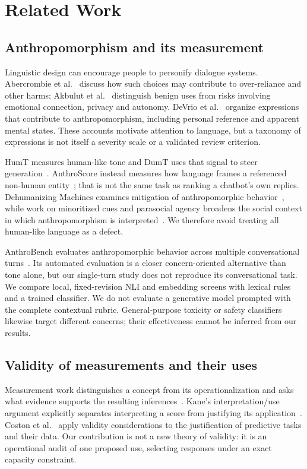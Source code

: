 \section{Related Work}
\subsection{Anthropomorphism and its measurement}
Linguistic design can encourage people to personify dialogue systems. Abercrombie et al.~\cite{abercrombie2023anthropomorphism} discuss how such choices may contribute to over-reliance and other harms; Akbulut et al.~\cite{akbulut2024anthropomorphism} distinguish benign uses from risks involving emotional connection, privacy and autonomy. DeVrio et al.~\cite{devrio2025taxonomy} organize expressions that contribute to anthropomorphism, including personal reference and apparent mental states. These accounts motivate attention to language, but a taxonomy of expressions is not itself a severity scale or a validated review criterion.

HumT measures human-like tone and DumT uses that signal to steer generation~\cite{cheng2025humt}. AnthroScore instead measures how language frames a referenced non-human entity~\cite{cheng2024anthroscore}; that is not the same task as ranking a chatbot's own replies. Dehumanizing Machines examines mitigation of anthropomorphic behavior~\cite{cheng2025dehumanizing}, while work on minoritized cues and parasocial agency broadens the social context in which anthropomorphism is interpreted~\cite{basoah2025hunty,maeda2024parasocial}. We therefore avoid treating all human-like language as a defect.

AnthroBench evaluates anthropomorphic behavior across multiple conversational turns~\cite{ibrahim2026anthrobench}. Its automated evaluation is a closer concern-oriented alternative than tone alone, but our single-turn study does not reproduce its conversational task. We compare local, fixed-revision NLI and embedding screens with lexical rules and a trained classifier. We do not evaluate a generative model prompted with the complete contextual rubric. General-purpose toxicity or safety classifiers likewise target different concerns; their effectiveness cannot be inferred from our results.

\subsection{Validity of measurements and their uses}
Measurement work distinguishes a concept from its operationalization and asks what evidence supports the resulting inferences~\cite{jacobs2021measurement,wallach2025measurement}. Kane's interpretation/use argument explicitly separates interpreting a score from justifying its application~\cite{kane2013validation}. Coston et al.~\cite{coston2023validity} apply validity considerations to the justification of predictive tasks and their data. Our contribution is not a new theory of validity: it is an operational audit of one proposed use, selecting responses under an exact capacity constraint.

